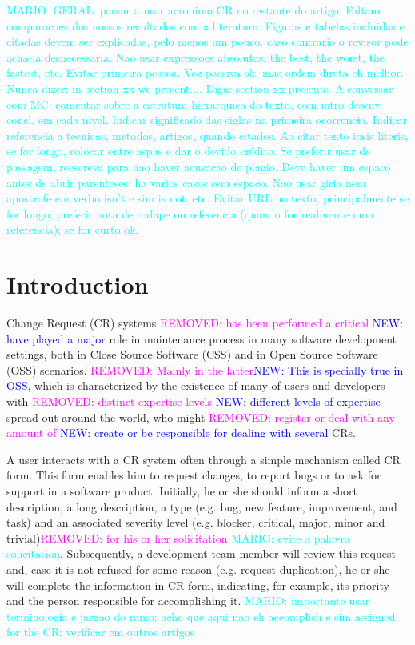 \documentclass[10pt, conference]{IEEEtran}
\newcommand{\mario}[1]{\noindent\textcolor{cyan}{MARIO: {#1}}}
\newcommand{\rem}[1]{\noindent\textcolor{magenta}{REMOVED: {#1}}}
\newcommand{\new}[1]{\noindent\textcolor{blue}{NEW: {#1}}}
\newcommand{\mario}[1]{}
\newcommand{\rem}[1]{}
\newcommand{\new}[1]{#1}
\begin{document}
\mario{GERAL: passar a usar acronimo CR no restante do artigo. Faltam comparacoes dos nossos resultados com a literatura. Figuras e tabelas incluidas e citadas devem ser explicadas, pelo menos um pouco, caso contrario o revisor pode acha-la desnecessaria. Nao usar expressoes absolutas: the best, the worst, the fastest, etc. Evitar primeira pessoa. Voz passiva ok, mas ordem direta eh melhor.  Nunca dizer: in section xx we present.... Diga: section xx presents. A conversar com MC: comentar sobre a estrutura hierarquica do texto, com intro-desenv-concl, em cada nivel. Indicar significado das siglas na primeira ocorrencia. Indicar referencia a tecnicas, metodos, artigos, quando citados. Ao citar texto ipsis literis, se for longo, colocar entre aspas e dar o devido crédito. Se preferir usar de passagem, reescreva para nao haver acusacao de plagio. Deve haver um espaco antes de abrir parenteses; ha varios casos sem espaco.  Nao usar giria nem apostrofe em verbo isn't e sim is not, etc. Evitar URL no texto, principalmente se for longo; preferir nota de rodape ou referencia (quando for realmente uma referencia); se for curto ok. }


\section{Introduction}
Change Request (CR) systems \rem{has been performed a critical} \new{have played a major} role in maintenance process in many software development settings, both in Close Source Software (CSS) and in Open Source Software (OSS) scenarios. \rem{Mainly in the latter}\new{This is specially true in OSS}, which is characterized by the existence of many of users and developers with \rem{distinct expertise levels} \new{different levels of expertise} spread out around the world, who might \rem{register or deal with any amount of} \new{create or be responsible for dealing with several} CRs\cite{Cavalcanti2014}. 

A user interacts with a CR system often through a simple mechanism called CR form. This form enables him to request changes, to report bugs or to ask for support in a software product\cite{Sommerville2010}. Initially, he or she should inform a short description, a long description, a type (e.g. bug, new feature, improvement, and task) and an associated severity level (e.g. blocker, critical, major, minor and trivial)\rem{ for his or her solicitation} \mario{evite a palavra solicitation}. Subsequently, a development team member will review this request and, case it is not refused for some reason (e.g. request duplication), he or she will complete the information in CR form, indicating, for example, its priority and the person responsible for accomplishing it. \mario{importante usar terminologia e jargao do ramo: acho que aqui nao eh accomplish e sim assigned for the CR; verificar em outros artigos}
\end{document}
